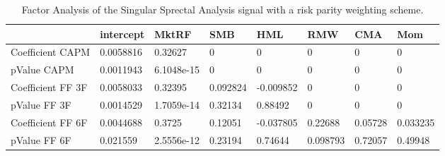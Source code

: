 \begin{table}[H]
\centering
\begin{tabular}{llllllll}
& intercept & MktRF & SMB & HML & RMW & CMA & Mom \\ 
\hline 
Coefficient CAPM & 0.0058816 & 0.32627 & 0 & 0 & 0 & 0 & 0 \\ 
pValue CAPM & 0.0011943 & 6.1048e-15 & 0 & 0 & 0 & 0 & 0 \\ 
Coefficient FF 3F & 0.0058033 & 0.32395 & 0.092824 & -0.009852 & 0 & 0 & 0 \\ 
pValue FF 3F & 0.0014529 & 1.7059e-14 & 0.32134 & 0.88492 & 0 & 0 & 0 \\ 
Coefficient FF 6F & 0.0044688 & 0.3725 & 0.12051 & -0.037805 & 0.22688 & 0.05728 & 0.033235 \\ 
pValue FF 6F & 0.021559 & 2.5556e-12 & 0.23194 & 0.74644 & 0.098793 & 0.72057 & 0.49948 \\ 
\hline
\end{tabular}
\caption{Factor Analysis of the Singular Sprectal Analysis signal with a risk parity weighting scheme.}
\label{SSA_RP_FACTOR}
\end{table}